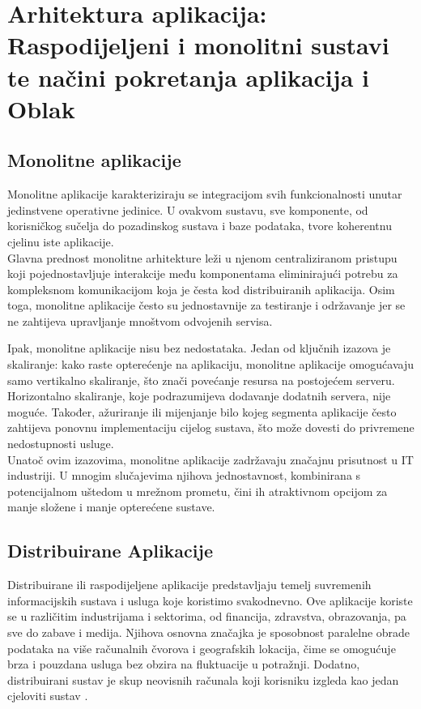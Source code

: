\documentclass[times, utf8, diplomski]{fer}
\begin{document}
\chapter{Arhitektura aplikacija: Raspodijeljeni i monolitni sustavi te načini pokretanja aplikacija i Oblak}

\section{Monolitne aplikacije}

Monolitne aplikacije karakteriziraju se integracijom svih funkcionalnosti unutar jedinstvene operativne jedinice. U ovakvom sustavu, sve komponente, od korisničkog sučelja do pozadinskog sustava i baze podataka, tvore koherentnu cjelinu iste aplikacije. \\

Glavna prednost monolitne arhitekture leži u njenom centraliziranom pristupu koji pojednostavljuje interakcije među komponentama eliminirajući potrebu za kompleksnom komunikacijom koja je česta kod distribuiranih aplikacija. Osim toga, monolitne aplikacije često su jednostavnije za testiranje i održavanje jer se ne zahtijeva upravljanje mnoštvom odvojenih servisa. 

Ipak, monolitne aplikacije nisu bez nedostataka. Jedan od ključnih izazova je skaliranje: kako raste opterećenje na aplikaciju, monolitne aplikacije omogućavaju samo vertikalno skaliranje, što znači povećanje resursa na postojećem serveru. Horizontalno skaliranje, koje podrazumijeva dodavanje dodatnih servera, nije moguće. Također, ažuriranje ili mijenjanje bilo kojeg segmenta aplikacije često zahtijeva ponovnu implementaciju  cijelog sustava, što može dovesti do privremene nedostupnosti usluge. \\

Unatoč ovim izazovima, monolitne aplikacije zadržavaju značajnu prisutnost u IT industriji. U mnogim slučajevima njihova jednostavnost, kombinirana s potencijalnom uštedom u mrežnom prometu, čini ih atraktivnom opcijom za manje složene i manje opterećene sustave.

\section{Distribuirane Aplikacije}

Distribuirane ili raspodijeljene aplikacije predstavljaju temelj suvremenih informacijskih sustava i usluga koje koristimo svakodnevno. Ove aplikacije koriste se u različitim industrijama i sektorima, od financija, zdravstva, obrazovanja, pa sve do zabave i medija. Njihova osnovna značajka je sposobnost paralelne obrade podataka na više računalnih čvorova i geografskih lokacija, čime se omogućuje brza i pouzdana usluga bez obzira na fluktuacije u potražnji. Dodatno, distribuirani sustav je skup neovisnih računala koji korisniku izgleda kao jedan cjeloviti sustav \citep{tanenbaum_distributed_2007}.\\
\end{document}
